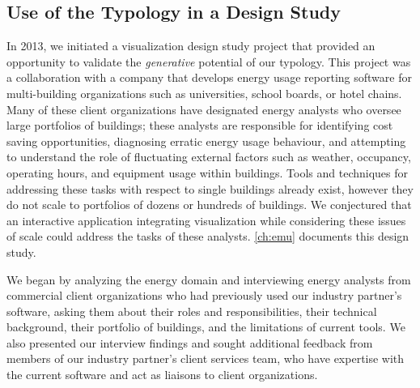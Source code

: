 
\subsection{Use of the Typology in a Design Study}
\label{intro:p4}


In 2013, we initiated a visualization design study project that provided an opportunity to validate the {\it generative} potential of our typology.
This project was a collaboration with a company that develops energy usage reporting software for multi-building organizations such as universities, school boards, or hotel chains.
Many of these client organizations have designated energy analysts who oversee large portfolios of buildings; these analysts are responsible for identifying cost saving opportunities, diagnosing erratic energy usage behaviour, and attempting to understand the role of fluctuating external factors such as weather, occupancy, operating hours, and equipment usage within buildings.
Tools and techniques for addressing these tasks with respect to single buildings already exist, however they do not scale to portfolios of dozens or hundreds of buildings.
We conjectured that an interactive application integrating visualization while considering these issues of scale could address the tasks of these analysts.
\autoref{ch:emu} documents this design study.

We began by analyzing the energy domain and interviewing energy analysts from commercial client organizations who had previously used our industry partner's software, asking them about their roles and responsibilities, their technical background, their portfolio of buildings, and the limitations of current tools.
We also presented our interview findings and sought additional feedback from members of our industry partner's client services team, who have expertise with the current software and act as liaisons to client organizations.

